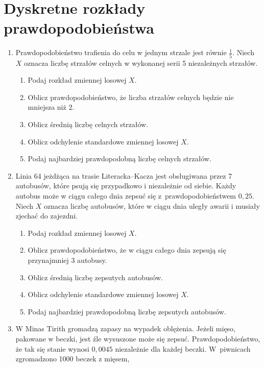 \documentclass[twoside]{mwart}
\newcommand{\ans}[1]{}
\newcommand{\ans}[1]{\par\emph{Odpowiedź:} #1}
\begin{document}
\clearpage
\section{Dyskretne rozkłady prawdopodobieństwa}
\begin{enumerate}
\item Prawdopodobieństwo trafienia do celu w jednym strzale jest równie $\frac{1}{5}$. Niech $X$ oznacza liczbę strzałów celnych w wykonanej serii 5 niezależnych strzałów. 
\begin{enumerate}
\item Podaj rozkład zmiennej losowej $X$. \ans{$P(X=k)={5 \choose k}\frac{4^{5-k}}{5^5}$}
\item Oblicz prawdopodobieństwo, że liczba strzałów celnych będzie nie mniejsza niż 2. \ans{$P(X\geq 2)=1-P(X=0)-P(X=1)=1-\frac{4^5}{5^5}-5\cdot\frac{4^4}{5^5}=\frac{821}{3125}\approx0{,}263$}
\item Oblicz średnią liczbę celnych strzałów. \ans{$EX=np=1$}
\item Oblicz odchylenie standardowe zmiennej losowej $X$. \ans{$DX=\sqrt{np(1-p)}=\sqrt{\frac{4}{5}}$}
\item Podaj najbardziej prawdopodobną liczbę celnych strzałów. \ans{$\lfloor(n+1)p\rfloor=1$}
\end{enumerate}
\item Linia 64 jeżdżąca na trasie Literacka--Kacza jest obsługiwana przez 7 autobusów, które psują się przypadkowo i niezależnie od siebie. Każdy autobus może w ciągu całego dnia zepsuć się z~prawdopodobieństwem $0{,}25$. Niech $X$ oznacza liczbę autobusów, które w ciągu dnia uległy awarii i musiały zjechać do zajezdni.
\begin{enumerate}
\item Podaj rozkład zmiennej losowej $X$.
\item Oblicz prawdopodobieństwo, że w ciągu całego dnia zepsują się przynajmniej 3 autobusy.
\item Oblicz średnią liczbę zepsutych autobusów.
\item Oblicz odchylenie standardowe zmiennej losowej $X$.
\item Podaj najbardziej prawdopodobną liczbę zepsutych autobusów. \ans{$(n+1)p-1=1, (n+1)p=2$}
\end{enumerate}
\item W Minas Tirith gromadzą zapasy na wypadek oblężenia. Jeżeli mięso,
pakowane w beczki, jest źle wysuszone może się zepsuć. Prawdopodobieństwo, że
tak się stanie wynosi $0{,}0045$ niezależnie dla każdej beczki. W~piwnicach zgromadzono 1000 beczek z mięsem,

\end{enumerate}
\end{document}
